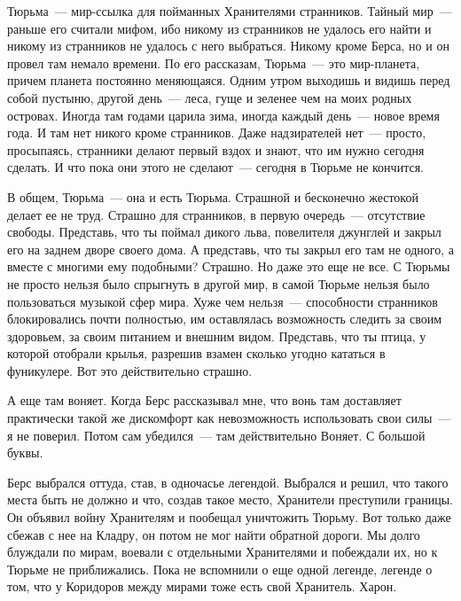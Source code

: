 Тюрьма~--- мир-ссылка для пойманных Хранителями странников. Тайный мир~--- 
раньше его считали мифом, ибо никому из странников не удалось его найти и никому из 
странников не удалось с него выбраться. Никому кроме Берса, но и он провел там 
немало времени. По его рассказам, Тюрьма~--- это мир-планета, причем планета 
постоянно меняющаяся. Одним утром выходишь и видишь перед собой пустыню, другой 
день~--- леса, гуще и зеленее чем на моих родных островах. Иногда там годами 
царила зима, иногда каждый день~--- новое время года. И там нет никого кроме 
странников. Даже надзирателей нет~--- просто, просыпаясь, странники делают 
первый вздох и знают, что им нужно сегодня сделать. И что пока они этого не 
сделают~--- сегодня в Тюрьме не кончится.

В общем, Тюрьма~--- она и есть Тюрьма. Страшной и бесконечно жестокой делает ее 
не труд. Страшно для странников, в первую очередь~--- отсутствие свободы. 
Представь, что ты поймал дикого льва, повелителя джунглей и закрыл его на заднем дворе 
своего дома. А представь, что ты закрыл его там не одного, а вместе с многими 
ему подобными? Страшно. Но даже это еще не все. С Тюрьмы не просто нельзя было 
спрыгнуть в другой мир, в самой Тюрьме нельзя было пользоваться музыкой сфер 
мира. Хуже чем нельзя~--- способности странников блокировались почти полностью, 
им оставлялась возможность следить за своим здоровьем, за своим питанием и внешним 
видом. Представь, что ты птица, у которой отобрали крылья, разрешив взамен 
сколько угодно кататься в фуникулере. Вот это действительно страшно.

А еще там воняет. Когда Берс рассказывал мне, что вонь там доставляет 
практически такой же дискомфорт как невозможность использовать свои силы~--- я 
не поверил. Потом сам убедился~--- там действительно Воняет. С большой буквы.

Берс выбрался оттуда, став, в одночасье легендой. Выбрался и решил, что такого 
места быть не должно и что, создав такое место, Хранители преступили границы. 
Он объявил войну Хранителям и пообещал уничтожить Тюрьму. Вот только даже сбежав с 
нее на Кладру, он потом не мог найти обратной дороги. Мы долго блуждали по 
мирам, воевали с отдельными Хранителями и побеждали их, но к Тюрьме не 
приближались. Пока не вспомнили о еще одной легенде, легенде о том, что у 
Коридоров между мирами тоже есть свой Хранитель. Харон.

